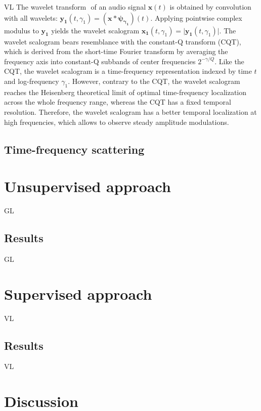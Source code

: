 \documentclass[journal]{IEEEtran}
\begin{document}
VL
The wavelet transform $\boldsymbol{}$ of an audio signal
$\boldsymbol{x}(t)$ is obtained by convolution with all wavelets:
$\boldsymbol{y_1}(t, \gamma_1) =
(\boldsymbol{x} \ast \boldsymbol{\psi_{\gamma_1}})(t)$.
Applying pointwise complex modulus to $\boldsymbol{y_1}$ yields
the wavelet scalogram
$\boldsymbol{x_1}(t, \gamma_1) = \vert \boldsymbol{y_1}(t, \gamma_1)\vert$.
The wavelet scalogram bears resemblance with the constant-Q transform (CQT),
which is derived from the short-time Fourier transform by averaging the frequency
axis into constant-Q subbands of center frequencies $2^{-\gamma/Q}$.
Like the CQT, the wavelet scalogram is
a time-frequency representation indexed by time $t$ and log-frequency $\gamma_1$.
However, contrary to the CQT, the wavelet scalogram reaches the Heisenberg
theoretical limit of optimal time-frequency localization across the whole
frequency range, whereas the CQT has a fixed temporal resolution.
Therefore, the wavelet scalogram has a better temporal localization at high
frequencies, which allows to observe steady amplitude modulations.

\subsection{Time-frequency scattering}
\section{Unsupervised approach}

GL

\subsection{Results}

GL

\section{Supervised approach}

VL


\subsection{Results}

VL

\section{Discussion}
\end{document}
